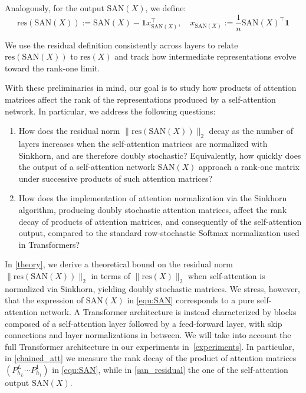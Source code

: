 \documentclass{article}
\theoremstyle{definition}
\theoremstyle{plain}
\begin{document}
{Analogously, for the output $\mathrm{SAN}(X)$, we define:
\begin{equation}\label{equ:residual_san}
\mathrm{res}(\mathrm{SAN}(X)) := \mathrm{SAN}(X) - \mathbf{1} x_{\mathrm{SAN}(X)}^\top,
\quad
x_{\mathrm{SAN}(X)} := \frac{1}{n} \mathrm{SAN}(X)^\top \mathbf{1}
\end{equation}

We use the residual definition consistently across layers to relate $\mathrm{res}(\mathrm{SAN}(X))$ to $\mathrm{res}(X)$ and track how intermediate representations evolve toward the rank-one limit.

{With these preliminaries in mind, our goal is to study how products of attention matrices affect the rank of the representations produced by a self-attention network. In particular, we address the following questions:}

\begin{enumerate}[leftmargin=*]
\item {How does the residual norm $\|\mathrm{res}(\mathrm{SAN}(X))\|_2$ decay as the number of layers increases when the self-attention matrices are normalized with Sinkhorn, and are therefore doubly stochastic? Equivalently, how quickly does the output of a self-attention network $\mathrm{SAN}(X)$ approach a rank-one matrix under successive products of such attention matrices?}
\item {How does the implementation of attention normalization via the Sinkhorn algorithm, producing doubly stochastic attention matrices, affect the rank decay of products of attention matrices, and consequently of the self-attention output, compared to the standard row-stochastic Softmax normalization used in Transformers?}
\end{enumerate}

In \cref{theory}, we derive a theoretical bound on the residual norm $\|\mathrm{res}(\mathrm{SAN}(X))\|_2$ in terms of $\|\mathrm{res}(X)\|_2$ when self-attention is normalized via Sinkhorn, yielding doubly stochastic matrices. We stress, however, that the expression of $\mathrm{SAN}(X)$ in \ref{equ:SAN} corresponds to a pure self-attention network. A Transformer architecture is instead characterized by blocks composed of a self-attention layer followed by a feed-forward layer, with skip connections and layer normalizations in between. We will take into account the full Transformer architecture in our experiments in~\cref{experiments}. {In particular, in \cref{chained_att} we measure the rank decay of the product of attention matrices $\left(P^{L}_{h_L} \cdots P^{1}_{h_1}\right)$ in \ref{equ:SAN}, while in \cref{san_residual} the one of the self-attention output $\mathrm{SAN}(X)$.}

}
\end{document}
